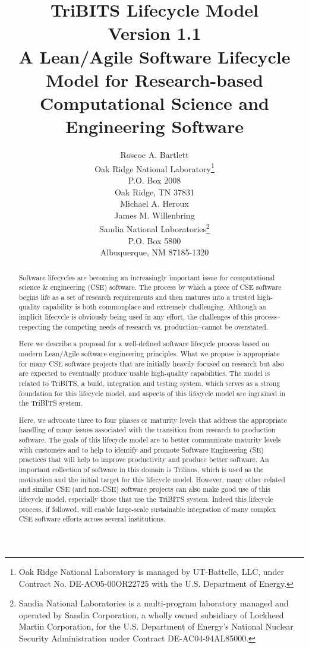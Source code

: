 \documentclass[11pt]{SANDreport}
\title{
TriBITS Lifecycle Model \\[2ex] Version 1.1 \\[2ex] \large A
Lean/Agile Software Lifecycle Model for Research-based Computational
Science and Engineering Software }
\author{
Roscoe A. Bartlett \\ Oak Ridge National Laboratory\footnote{Oak Ridge National Laboratory is managed by UT-Battelle, LLC, under Contract No. DE-AC05-00OR22725 with the U.S. Department of Energy.} \\ P.O. Box 2008 \\ Oak Ridge, TN 37831
\\[2ex] Michael A. Heroux \\ James M. Willenbring \\ Sandia National Laboratories\footnote{Sandia National Laboratories is a  multi-program laboratory managed and operated by Sandia Corporation,  a wholly owned subsidiary of Lockheed Martin Corporation, for the U.S. Department of Energy’s National Nuclear Security Administration under Contract DE-AC04-94AL85000.} \\ P.O. Box 5800 \\ Albuquerque, NM 87185-1320 \\
}
\date{}
\begin{document}

\maketitle

%

%
\begin{abstract}
%

Software lifecycles are becoming an increasingly important issue for computational science \& engineering (CSE) software.  The process by which a piece of CSE software begins life as a set of research requirements and then matures into a trusted high-quality capability is both commonplace and extremely challenging.  Although an implicit lifecycle is obviously being used in any effort, the challenges of this process--respecting the competing needs of research vs. production--cannot be overstated.

Here we describe a proposal for a well-defined software lifecycle process based on modern Lean/Agile software engineering principles. What we propose is appropriate for many CSE software projects that are initially heavily focused on research but also are expected to eventually produce usable high-quality capabilities.  The model is related to TriBITS, a build, integration and testing system, which serves as a strong foundation for this lifecycle model, and aspects of this lifecycle model are ingrained in the TriBITS system.

Here, we advocate three to four phases or maturity levels that address the appropriate handling of many issues associated with the transition from research to production software.  The goals of this lifecycle model are to better communicate maturity levels with customers and to help to identify and promote Software Engineering (SE) practices that will help to improve productivity and produce better software.  An important collection of software in this domain is Trilinos, which is used as the motivation and the initial target for this lifecycle model.  However, many other related and similar CSE (and non-CSE) software projects can also make good use of this lifecycle model, especially those that use the TriBITS system.  Indeed this lifecycle process, if followed, will enable large-scale sustainable integration of many complex CSE software efforts across several institutions.

%
\end{abstract}
%
\end{document}
